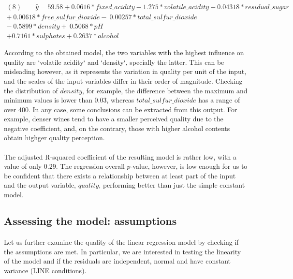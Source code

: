 \documentclass[10pt]{article}
\begin{document}
\begin{equation*}
\begin{aligned}	
(8) \ \ \ \  \ \  \ \ \  \hat{y} = 59.58 + 0.0616*fixed\_acidity  -1.275*volatile\_acidity 
+0.04318*residual\_sugar \\
+ \  0.00618*free\_sulfur\_dioxide  - \ 0.00257*total\_sulfur\_dioxide   
\\ - \ 0.5899*density  + \ 0.5068*pH   \\+ 0.7161*sulphates + 0.2637*alcohol
\end{aligned}
\end{equation*}

According to the obtained model, the two variables with the highest influence on quality are `volatile acidity` and `density`, specially the latter. This can be misleading however, as it represents the variation in quality per unit of the input, and the scales of the input variables differ in their order of magnitude. Checking the distribution of $density$, for example, the difference between the maximum and minimum values is lower than 0.03, whereas $total\_sulfur\_dioxide$ has a range of over 400. In any case, some conclusions can be extracted from this output. For example, denser wines tend to have a smaller perceived quality due to the negative coefficient, and, on the contrary, those with higher alcohol contents obtain highger quality perception.

\paragraph*{}
The adjusted R-squared coefficient of the resulting model is rather low, with a value of only 0.29. The regression overall $p$-value, however, is low enough for us to be confident that there exists a relationship between at least part of the input and the output variable, $quality$, performing better than just the simple constant model.

\subsection{Assessing the model: assumptions}

\paragraph*{}
Let us further examine the quality of the linear regression model by checking if the assumptions are met. In particular, we are interested in testing the linearity of the model and if the residuals are independent, normal and have constant variance (LINE conditions).
\end{document}
